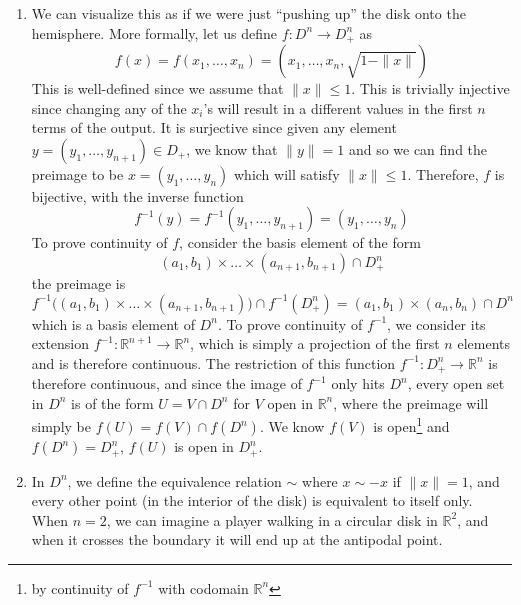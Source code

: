 \begin{solution}
\begin{enumerate}
      \item We can visualize this as if we were just ``pushing up'' the disk onto the hemisphere. More formally, let us define $f: D^n \rightarrow D_+^n$ as 
      \begin{equation}
        f(x) = f(x_1, \ldots, x_n) = (x_1, \ldots, x_n, \sqrt{1 - \|x\|})
      \end{equation}
      This is well-defined since we assume that $\|x\| \leq 1$. This is trivially injective since changing any of the $x_i$'s will result in a different values in the first $n$ terms of the output. It is surjective since given any element $y = (y_1, \ldots, y_{n+1}) \in D_+$, we know that $\|y\| = 1$ and so we can find the preimage to be $x = (y_1, \ldots, y_n)$ which will satisfy $\|x\| \leq 1$. Therefore, $f$ is bijective, with the inverse function 
      \begin{equation}
        f^{-1} (y) = f^{-1} (y_1, \ldots, y_{n+1}) = (y_1, \ldots, y_{n})
      \end{equation}
      To prove continuity of $f$, consider the basis element of the form 
      \begin{equation}
        (a_1, b_1) \times \ldots \times (a_{n+1}, b_{n+1}) \cap D_+^n 
      \end{equation}
      the preimage is 
      \begin{equation}
        f^{-1} \big( (a_1, b_1) \times \ldots \times (a_{n+1}, b_{n+1})\big) \cap f^{-1} (D_+^n) = (a_1, b_1) \times (a_n, b_n) \cap D^n 
      \end{equation}
      which is a basis element of $D^n$. To prove continuity of $f^{-1}$, we consider its extension $f^{-1}: \mathbb{R}^{n+1} \rightarrow \mathbb{R}^n$, which is simply a projection of the first $n$ elements and is therefore continuous. The restriction of this function $f^{-1}: D_+^n \rightarrow \mathbb{R}^n$ is therefore continuous, and since the image of $f^{-1}$ only hits $D^n$, every open set in $D^n$ is of the form $U = V \cap D^n$ for $V$ open in $\mathbb{R}^n$, where the preimage will simply be $f(U) = f(V) \cap f(D^n)$. We know $f(V)$ is open\footnote{by continuity of $f^{-1}$ with codomain $\mathbb{R}^n$} and $f(D^n) = D^n_+$, $f(U)$ is open in $D_+^n$. 

      \item In $D^n$, we define the equivalence relation $\sim$ where $x \sim -x$ if $\|x\| = 1$, and every other point (in the interior of the disk) is equivalent to itself only. When $n=2$, we can imagine a player walking in a circular disk in $\mathbb{R}^2$, and when it crosses the boundary it will end up at the antipodal point. 
    \end{enumerate}
  \end{solution}


